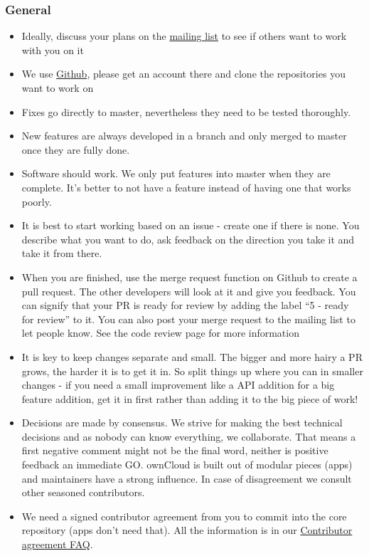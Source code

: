 \documentclass[letterpaper,10pt,english]{sphinxmanual}
\begin{document}
\subsubsection{General}
\label{general/codingguidelines:general}\begin{itemize}
\item {} 
Ideally, discuss your plans on the \href{https://mailman.owncloud.org/mailman/listinfo/devel}{mailing list} to see if others want to work with you on it

\item {} 
We use \href{https://github.com/owncloud}{Github}, please get an account there and clone the repositories you want to work on

\item {} 
Fixes go directly to master, nevertheless they need to be tested thoroughly.

\item {} 
New features are always developed in a branch and only merged to master once they are fully done.

\item {} 
Software should work. We only put features into master when they are complete. It's better to not have a feature instead of having one that works poorly.

\item {} 
It is best to start working based on an issue - create one if there is none. You describe what you want to do, ask feedback on the direction you take it and take it from there.

\item {} 
When you are finished, use the merge request function on Github to create a pull request. The other developers will look at it and give you feedback. You can signify that your PR is ready for review by adding the label ``5 - ready for review'' to it. You can also post your merge request to the mailing list to let people know. See the code review page for more information

\item {} 
It is key to keep changes separate and small. The bigger and more hairy a PR grows, the harder it is to get it in. So split things up where you can in smaller changes - if you need a small improvement like a API addition for a big feature addition, get it in first rather than adding it to the big piece of work!

\item {} 
Decisions are made by consensus. We strive for making the best technical decisions and as nobody can know everything, we collaborate. That means a first negative comment might not be the final word, neither is positive feedback an immediate GO. ownCloud is built out of modular pieces (apps) and maintainers have a strong influence. In case of disagreement we consult other seasoned contributors.

\item {} 
We need a signed contributor agreement from you to commit into the core repository (apps don't need that). All the information is in our \href{https://owncloud.org/contribute/agreement/}{Contributor agreement FAQ}.

\end{itemize}
\end{document}
